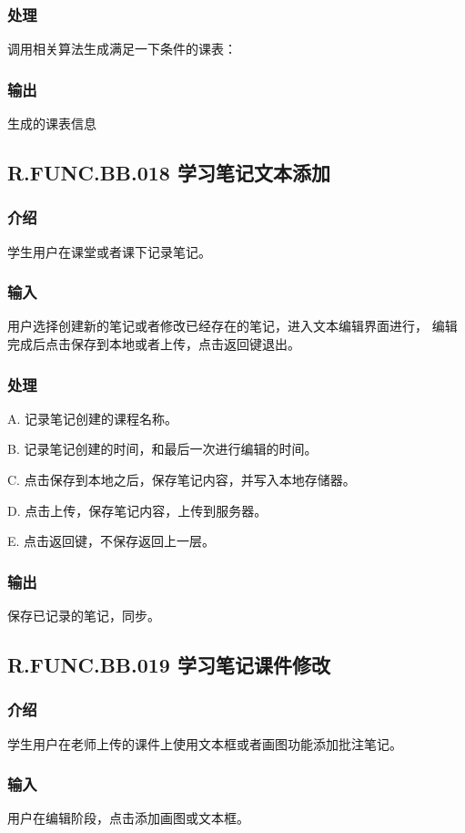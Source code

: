 \begin{enumerate}
    \subsubsection{处理}
    调用相关算法生成满足一下条件的课表：
    \subsubsection{输出}
    生成的课表信息


 \subsection{R.FUNC.BB.018 学习笔记文本添加}
    \subsubsection{介绍}
	学生用户在课堂或者课下记录笔记。
    \subsubsection{输入}
	用户选择创建新的笔记或者修改已经存在的笔记，进入文本编辑界面进行，
编辑完成后点击保存到本地或者上传，点击返回键退出。
    \subsubsection{处理}
	A. 记录笔记创建的课程名称。

	B. 记录笔记创建的时间，和最后一次进行编辑的时间。

	C. 点击保存到本地之后，保存笔记内容，并写入本地存储器。

	D. 点击上传，保存笔记内容，上传到服务器。

	E. 点击返回键，不保存返回上一层。
    \subsubsection{输出}
	保存已记录的笔记，同步。
 \subsection{R.FUNC.BB.019 学习笔记课件修改}
    \subsubsection{介绍}
	学生用户在老师上传的课件上使用文本框或者画图功能添加批注笔记。
    \subsubsection{输入}
	用户在编辑阶段，点击添加画图或文本框。

\end{enumerate}
